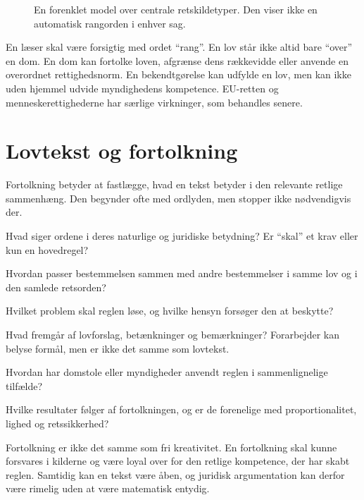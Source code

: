 \begin{figure}[ht]
\centering

\caption{En forenklet model over centrale retskildetyper. Den viser ikke en automatisk rangorden i enhver sag.}
\label{fig:pyramid}
\end{figure}

En læser skal være forsigtig med ordet ``rang''. En lov står ikke altid bare ``over'' en dom. En dom kan fortolke loven, afgrænse dens rækkevidde eller anvende en overordnet rettighedsnorm. En bekendtgørelse kan udfylde en lov, men kan ikke uden hjemmel udvide myndighedens kompetence. EU-retten og menneskerettighederne har særlige virkninger, som behandles senere.

\section{Lovtekst og fortolkning}

Fortolkning betyder at fastlægge, hvad en tekst betyder i den relevante retlige sammenhæng. Den begynder ofte med ordlyden, men stopper ikke nødvendigvis der.

\begin{description}[style=nextline,leftmargin=0pt,labelindent=0pt]
  \item[Ordlyd] Hvad siger ordene i deres naturlige og juridiske betydning? Er ``skal'' et krav eller kun en hovedregel?
  \item[Systematik] Hvordan passer bestemmelsen sammen med andre bestemmelser i samme lov og i den samlede retsorden?
  \item[Formål] Hvilket problem skal reglen løse, og hvilke hensyn forsøger den at beskytte?
  \item[Forarbejder] Hvad fremgår af lovforslag, betænkninger og bemærkninger? Forarbejder kan belyse formål, men er ikke det samme som lovtekst.
  \item[Praksis] Hvordan har domstole eller myndigheder anvendt reglen i sammenlignelige tilfælde?
  \item[Konsekvenser] Hvilke resultater følger af fortolkningen, og er de forenelige med proportionalitet, lighed og retssikkerhed?
\end{description}

Fortolkning er ikke det samme som fri kreativitet. En fortolkning skal kunne forsvares i kilderne og være loyal over for den retlige kompetence, der har skabt reglen. Samtidig kan en tekst være åben, og juridisk argumentation kan derfor være rimelig uden at være matematisk entydig.

